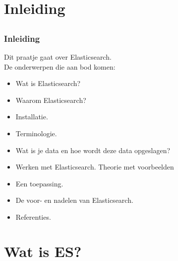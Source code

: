 \section{Inleiding}
\subsection{}
\begin{styleframe}
	\frametitle{Inleiding}
Dit praatje gaat over Elasticsearch.\\
\pause
De onderwerpen die aan bod komen:
\begin{itemize}[<+>]
	\item Wat is Elasticsearch?
	\item Waarom Elasticsearch?
	\item Installatie.
	\item Terminologie.
	\item Wat is je data en hoe wordt deze data opgeslagen?
	\item Werken met Elasticsearch. Theorie met voorbeelden
	\item Een toepassing.
	\item De voor- en nadelen van Elasticsearch.
	\item Referenties.
\end{itemize}
\end{styleframe}

\section{Wat is ES?}
